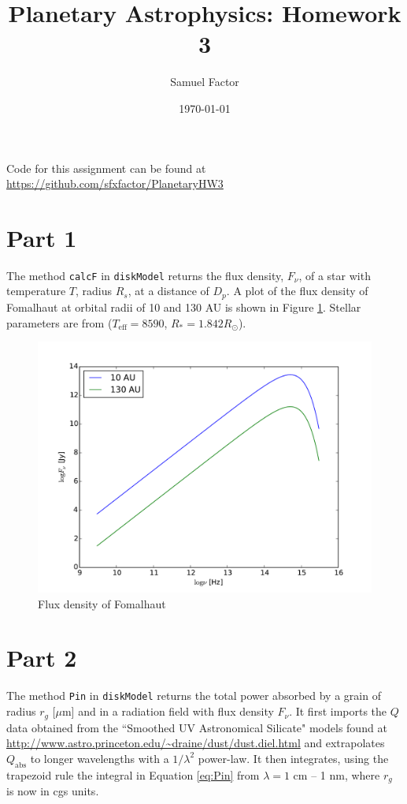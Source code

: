 \documentclass[12pt,preprint]{aastex}
\title{Planetary Astrophysics: Homework 3}
\author{Samuel Factor}
\date{\today}                                           %
\begin{document}
\maketitle
Code for this assignment can be found at \url{https://github.com/sfxfactor/PlanetaryHW3}

\section{Part 1}
The method \texttt{calcF} in \texttt{diskModel} returns the flux density, $F_\nu$, of a star with temperature $T$, radius $R_s$, at a distance of $D_p$. A plot of the flux density of Fomalhaut at orbital radii of 10 and 130 AU is shown in Figure \ref{fig:FomFnu}. Stellar parameters are from \citet{Fom} ($T_\mathrm{eff}=8590$, $R_*=1.842 R_\odot$). 

\begin{figure}[htbp]
\begin{center}
\includegraphics[width=\textwidth]{FomFnu.pdf}
    \caption{Flux density of Fomalhaut}
    \label{fig:FomFnu}
\end{center}
\end{figure}

\section{Part 2}
The method \texttt{Pin} in \texttt{diskModel} returns the total power absorbed by a grain of radius $r_g$ [$\mu$m] and in a radiation field with flux density $F_\nu$. It first imports the $Q$ data obtained from the ``Smoothed UV Astronomical Silicate" models found at \url{http://www.astro.princeton.edu/~draine/dust/dust.diel.html} and extrapolates $Q_\mathrm{abs}$ to longer wavelengths with a $1/\lambda^2$ power-law. It then integrates, using the trapezoid rule the integral in Equation \ref{eq:Pin} from $\lambda=1$ cm -- 1 nm, where $r_g$ is now in cgs units.
\end{document}

